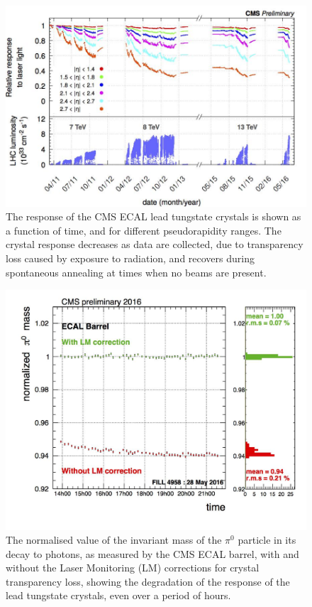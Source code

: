 \begin{figure}[h]
\centering
\includegraphics[width=1.0\textwidth]{detectorFigures/EcalLaserCorrections.jpg}
\caption{The response of the CMS ECAL lead tungstate crystals is shown as a function of time, and for different pseudorapidity ranges. The crystal response decreases as data are collected, due to transparency loss caused by exposure to radiation, and recovers during spontaneous annealing at times when no beams are present\quad\cite{CMSECALPublic}.}
\label{fig:cms:ecal:lasercorrections}
\end{figure}

\begin{figure}[h]
\centering
\includegraphics[width=1.0\textwidth]{detectorFigures/pi0_EB_plus_1.jpg}
\caption{The normalised value of the invariant mass of the $\pi^0$ particle in its decay to photons, as measured by the CMS ECAL barrel, with and without the Laser Monitoring (LM) corrections for crystal transparency loss, showing the degradation of the response of the lead tungstate crystals, even over a period of hours\quad\cite{CMSECALPublic}.}
\label{fig:cms:ecal:pizeroLMcorr}
\end{figure}

